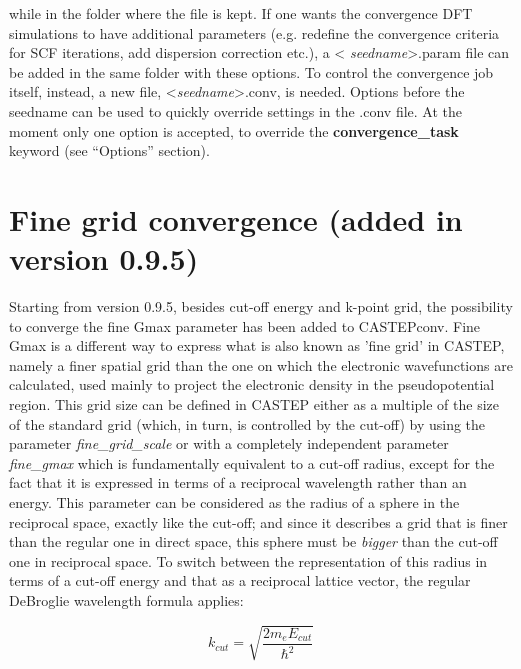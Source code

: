 \documentclass[10pt]{article}
\begin{document}
while in the folder where the file is kept. If one wants the convergence DFT 
simulations to have additional parameters (e.g. redefine the convergence 
criteria for SCF iterations, add dispersion correction etc.), a \textless 
\textit{seedname}\textgreater.param file can be added in the same folder with 
these options. To control the convergence job itself, instead, a new file, 
\textless \textit{seedname}\textgreater.conv, is needed.\newline
Options before the seedname can be used to quickly override settings in the .conv file. At the moment only one option is accepted, to override the \textbf{convergence\_task} keyword (see ``Options'' section).

\section{Fine grid convergence (added in version 0.9.5)}

Starting from version 0.9.5, besides cut-off energy and k-point grid, the possibility to converge the fine Gmax parameter has been added to CASTEPconv.\newline
Fine Gmax is a different way to express what is also known as 'fine grid' in CASTEP, namely a finer spatial grid than the one on which the electronic wavefunctions are calculated, used mainly to project the electronic density in the pseudopotential region. This grid size can be defined in CASTEP either as a multiple of the size of the standard grid (which, in turn, is controlled by the cut-off) by using the parameter \textit{fine\_grid\_scale} or with a completely independent parameter \textit{fine\_gmax} which is fundamentally equivalent to a cut-off radius, except for the fact that it is expressed in terms of a reciprocal wavelength rather than an energy. This parameter can be considered as the radius of a sphere in the reciprocal space, exactly like the cut-off; and since it describes a grid that is finer than the regular one in direct space, this sphere must be \textit{bigger} than the cut-off one in reciprocal space.\newline
To switch between the representation of this radius in terms of a cut-off energy and that as a reciprocal lattice vector, the regular DeBroglie wavelength formula applies:

\begin{equation}
 k_{cut} = \sqrt{\frac{2m_eE_{cut}}{\hbar^2}}
\end{equation}
\end{document}
